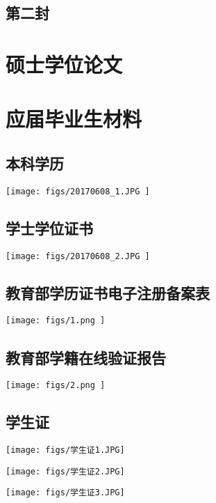 \documentclass[UFT8]{ctexart}
\begin{document}
\subsection{第二封}

\clearpage
\section{硕士学位论文}

\clearpage
\section{应届毕业生材料}
\subsection{本科学历}
\begin{center}
  \texttt{[image: figs/20170608\_1.JPG ]}
\end{center}

\subsection{学士学位证书}
\begin{center}
  \texttt{[image: figs/20170608\_2.JPG ]}
\end{center}


\subsection{教育部学历证书电子注册备案表}
\begin{center}
  \texttt{[image: figs/1.png ]}
\end{center}


\subsection{教育部学籍在线验证报告}
\begin{center}
  \texttt{[image: figs/2.png ]}
\end{center}

\clearpage
\subsection{学生证}
\begin{center}
  \texttt{[image: figs/学生证1.JPG]}
  
   \texttt{[image: figs/学生证2.JPG]}
    
  \texttt{[image: figs/学生证3.JPG]}
\end{center}
\end{document}
